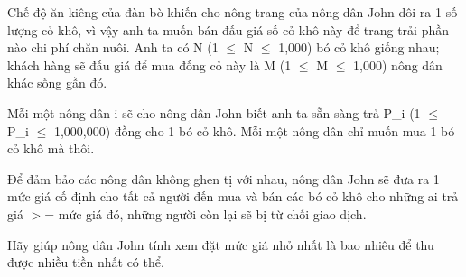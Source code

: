 Chế độ ăn kiêng của đàn bò khiến cho nông trang của nông dân John dôi ra 1 số lượng cỏ khô, vì vậy anh ta muốn bán đấu giá số cỏ khô này để trang trải phần nào chi phí chăn nuôi. Anh ta có N (1  $\le$  N  $\le$  1,000) bó cỏ khô giống nhau; khách hàng sẽ đấu giá để mua đống cỏ này là M (1  $\le$  M  $\le$  1,000) nông dân khác sống gần đó.  

   Mỗi một nông dân i sẽ cho nông dân John biết anh ta sẵn sàng trả P\_i (1  $\le$  P\_i  $\le$  1,000,000) đồng cho 1 bó cỏ khô. Mỗi một nông dân chỉ muốn mua 1 bó cỏ khô mà thôi.  

   Để đảm bảo các nông dân không ghen tị với nhau, nông dân John sẽ đưa ra 1 mức giá cố định cho tất cả người đến mua và bán các bó cỏ khô cho những ai trả giá $>$= mức giá đó, những người còn lại sẽ bị từ chối giao dịch.  

   Hãy giúp nông dân John tính xem đặt mức giá nhỏ nhất là bao nhiêu để thu được nhiều tiền nhất có thể.